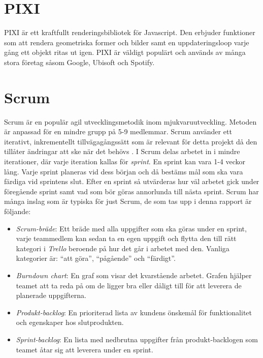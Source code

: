 \section{PIXI}
PIXI är ett kraftfullt renderingsbibliotek för Javascript. Den erbjuder funktioner som att rendera geometriska former och bilder samt en uppdateringsloop varje gång ett objekt ritas ut igen. PIXI är väldigt populärt och används av många stora företag såsom Google, Ubisoft och Spotify. \cite{Pixi}

\section{Scrum}
\label{theory:scrum}
Scrum är en populär agil utvecklingsmetodik inom mjukvaruutveckling. Metoden är anpassad för en mindre grupp på 5-9 medlemmar. Scrum använder ett iterativt, inkrementellt tillvägagångssätt som är relevant för detta projekt då den tillåter ändringar att ske när det behövs \cite{TheScrum}. I Scrum delas arbetet in i mindre iterationer, där varje iteration kallas för \textit{sprint}. En sprint kan vara 1-4 veckor lång. Varje sprint planeras vid dess början och då bestäms mål som ska vara färdiga vid sprintens slut. Efter en sprint så utvärderas hur väl arbetet gick under föregående sprint samt vad som bör göras annorlunda till nästa sprint. Scrum har många inslag som är typiska för just Scrum, de som tas upp i denna rapport är följande:

\begin{itemize}
	\item \textit{Scrum-bräde}: Ett bräde med alla uppgifter som ska göras under en sprint, varje teammedlem kan sedan ta en egen uppgift och flytta den till rätt kategori i \textit{Trello} beroende på hur det går i arbetet med den. Vanliga kategorier är: ``att göra'', ``pågående'' och ``färdigt''.

	\item \textit{Burndown chart}: En graf som visar det kvarstående arbetet. Grafen hjälper teamet att ta reda på om de ligger bra eller dåligt till för att leverera de planerade uppgifterna.

	\item \textit{Produkt-backlog}: En prioriterad lista av kundens önskemål för funktionalitet och egenskaper hos slutprodukten.

	\item \textit{Sprint-backlog}: En lista med nedbrutna uppgifter från produkt-backlogen som teamet åtar sig att leverera under en sprint.

\end{itemize}

